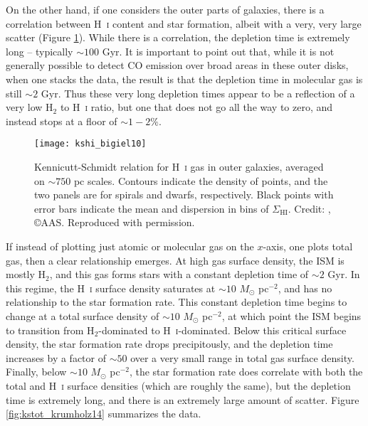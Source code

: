 On the other hand, if one considers the outer parts of galaxies, there is a correlation between H~\textsc{i} content and star formation, albeit with a very, very large scatter (Figure \ref{fig:kshi_bigiel10}). While there is a correlation, the depletion time is extremely long -- typically $\sim 100$ Gyr. It is important to point out that, while it is not generally possible to detect CO emission over broad areas in these outer disks, when one stacks the data, the result is that the depletion time in molecular gas is still $\sim 2$ Gyr. Thus these very long depletion times appear to be a reflection of a very low H$_2$ to H~\textsc{i} ratio, but one that does not go all the way to zero, and instead stops at a floor of $\sim 1-2\%$.

\begin{figure}
\texttt{[image: kshi\_bigiel10]}
\caption[Kennicutt-Schmidt relation for H~\textsc{i} gas in outer galaxies]{
\label{fig:kshi_bigiel10}
Kennicutt-Schmidt relation for H~\textsc{i} gas in outer galaxies, averaged on $\sim 750$ pc scales. Contours indicate the density of points, and the two panels are for spirals and dwarfs, respectively. Black points with error bars indicate the mean and dispersion in bins of $\Sigma_{\mathrm{HI}}$. Credit: \citet{bigiel10a}, \copyright AAS. Reproduced with permission.
}
\end{figure}

If instead of plotting just atomic or molecular gas on the $x$-axis, one plots total gas, then a clear relationship emerges. At high gas surface density, the ISM is mostly H$_2$, and this gas forms stars with a constant depletion time of $\sim 2$ Gyr. In this regime, the H~\textsc{i} surface density saturates at $\sim 10$ $M_\odot$ pc$^{-2}$, and has no relationship to the star formation rate. This constant depletion time begins to change at a total surface density of $\sim 10$ $M_\odot$ pc$^{-2}$, at which point the ISM begins to transition from H$_2$-dominated to H~\textsc{i}-dominated. Below this critical surface density, the star formation rate drops precipitously, and the depletion time increases by a factor of $\sim 50$ over a very small range in total gas surface density. Finally, below $\sim 10$ $M_\odot$ pc$^{-2}$, the star formation rate does correlate with both the total and H~\textsc{i} surface densities (which are roughly the same), but the depletion time is extremely long, and there is an extremely large amount of scatter. Figure \ref{fig:kstot_krumholz14} summarizes the data.

